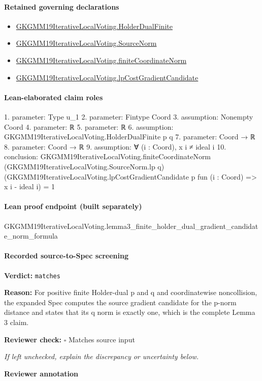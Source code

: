 \documentclass[10pt]{article}
\newcommand{\reviewerbox}{%
  \par\noindent\fbox{\parbox{0.96\linewidth}{\rule{0pt}{0.38in}}}\par
}
\newcommand{\reviewmatch}[1]{%
  \par\noindent\textbf{Reviewer check:} $\square$\; #1\par
  \noindent\emph{If left unchecked, explain the discrepancy or uncertainty below.}\par
}
\begin{document}
\paragraph{Retained governing declarations}
\begin{itemize}\raggedright
\item \hyperlink{governing-declaration-e4a57c47bb5fbb49}{GKGMM19\allowbreak{}Iterative\allowbreak{}Local\allowbreak{}Voting.\allowbreak{}Holder\allowbreak{}Dual\allowbreak{}Finite}
\item \hyperlink{governing-declaration-6fa4ab9852321b03}{GKGMM19\allowbreak{}Iterative\allowbreak{}Local\allowbreak{}Voting.\allowbreak{}Source\allowbreak{}Norm}
\item \hyperlink{governing-declaration-6b5981b41f6efa87}{GKGMM19\allowbreak{}Iterative\allowbreak{}Local\allowbreak{}Voting.\allowbreak{}finite\allowbreak{}Coordinate\allowbreak{}Norm}
\item \hyperlink{governing-declaration-bce3799389f4457e}{GKGMM19\allowbreak{}Iterative\allowbreak{}Local\allowbreak{}Voting.\allowbreak{}lp\allowbreak{}Cost\allowbreak{}Gradient\allowbreak{}Candidate}
\end{itemize}
\paragraph{Lean-elaborated claim roles}\begin{ReviewVerbatim}
1. parameter: Type u_1
2. parameter: Fintype Coord
3. assumption: Nonempty Coord
4. parameter: ℝ
5. parameter: ℝ
6. assumption: GKGMM19IterativeLocalVoting.HolderDualFinite p q
7. parameter: Coord → ℝ
8. parameter: Coord → ℝ
9. assumption: ∀ (i : Coord), x i ≠ ideal i
10. conclusion: GKGMM19IterativeLocalVoting.finiteCoordinateNorm (GKGMM19IterativeLocalVoting.SourceNorm.lp q)
    (GKGMM19IterativeLocalVoting.lpCostGradientCandidate p fun (i : Coord) => x i - ideal i) =
  1
\end{ReviewVerbatim}

\paragraph{Lean proof endpoint (built separately)}\begin{ReviewVerbatim}
GKGMM19IterativeLocalVoting.lemma3_finite_holder_dual_gradient_candidate_norm_formula
\end{ReviewVerbatim}

\paragraph{Recorded source-to-Spec screening}
\textbf{Verdict:} \texttt{matches}
\\
{\raggedright
\textbf{Reason:} For positive finite Holder-\allowbreak{}dual p and q and coordinatewise noncollision, the expanded Spec computes the source gradient candidate for the p-\allowbreak{}norm distance and states that its q norm is exactly one, which is the complete Lemma 3 claim.\allowbreak{}
\par}
\reviewmatch{Matches source input}
\noindent\textbf{Reviewer annotation}\par
\reviewerbox
\clearpage
\hypertarget{source-claim-807172637313be6b}{}
\hypertarget{source-section-0c7af8265958a9ea}{}
\end{document}
